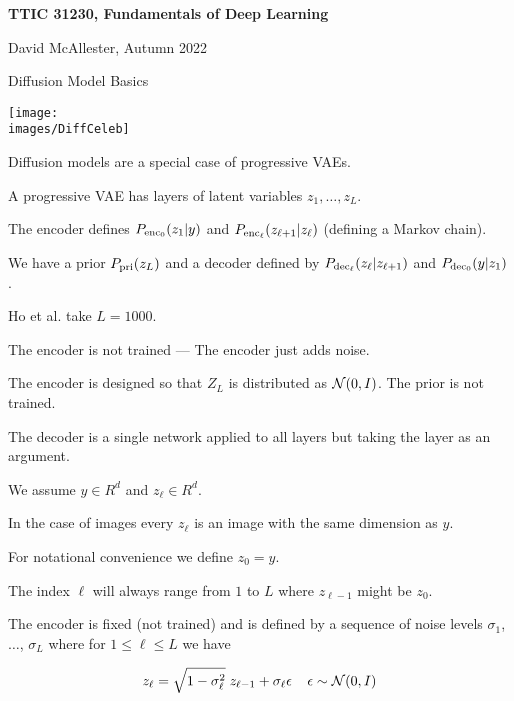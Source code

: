 





{\Huge

  \centerline{\bf TTIC 31230, Fundamentals of Deep Learning}
  \bigskip
  \centerline{David McAllester, Autumn 2022}
  \vfill
  \vfil
  \centerline{Diffusion Model Basics}
  \vfill
  \vfill


\centerline{\texttt{[image: \\images/DiffCeleb]}}



Diffusion models are a special case of progressive VAEs.

\vfill
A progressive VAE has layers of latent variables $z_1,\dots,z_{L}$.

\vfill
The encoder defines $P_{\mathrm{enc}_0}(z_1|y)$ and $P_{\mathrm{enc}_\ell}(z_{\ell+1}|z_\ell)$ (defining a Markov chain).

\vfill
We have a prior $P_{\mathrm{pri}}(z_L)$ and a decoder defined by $P_{\mathrm{dec}_\ell}(z_{\ell}|z_{\ell+1})$ and $P_{\mathrm{dec}_0}(y|z_1)$.

\vfill
Ho et al. take {\color{red} $L = 1000$.}


The encoder is not trained --- The encoder just adds noise.

\vfill
The encoder is designed so that $Z_L$ is distributed as ${\cal N}(0,I)$.  The prior is not trained.

\vfill
The decoder is a single network applied to all layers but taking the layer as an argument.


We assume $y \in R^d$ and $z_\ell \in R^d$.

\vfill
In the case of images every $z_\ell$ is an image with the same dimension as $y$.

\vfill
For notational convenience we define $z_0 = y$.

\vfill
The index $\ell$ will always range from $1$ to $L$ where $z_{\ell-1}$ might be $z_0$.

\vfill
The encoder is fixed (not trained) and is defined by a sequence of noise levels $\sigma_1$, $\ldots$, $\sigma_L$ where for $1 \leq \ell \leq L$ we have

$$z_\ell = \sqrt{1-\sigma^2_\ell}\;z_{\ell-1} + \sigma_\ell \epsilon\;\;\;\;\epsilon \sim {\cal N}(0,I)$$

}
